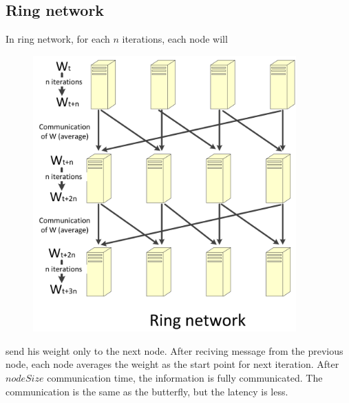 \documentclass[landscape,final,archE1,fontscale=0.35]{baposter}
\begin{document}
\begin{poster}
{\subsection*{Ring network}
In ring network, for each $n$ iterations, each node will
\begin{figure}
  \vspace{-70pt}
  \begin{center}
    \includegraphics[width=0.9\textwidth]{ring.jpg}
  \end{center}
  \vspace{-20pt}
  
  \vspace{-10pt}
\end{figure}
 send his weight only to the next node. After reciving message from the previous node, each node averages the weight as the start point for next iteration. After $nodeSize$ communication time, the information is fully communicated. The communication is the same as the butterfly, but the latency is less. 



}

\end{poster}
\end{document}
